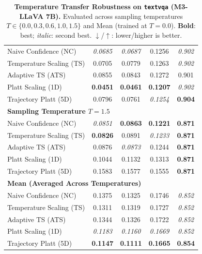 \begin{table}[t]
{\begin{tabular}{lcccc}
\midrule
Naive Confidence (NC) & \textit{0.0685} & \textit{0.0687} & 0.1256 & \textit{0.902} \\
Temperature Scaling (TS) & 0.0705 & 0.0779 & 0.1263 & \textit{0.902} \\
Adaptive TS (ATS) & 0.0855 & 0.0843 & 0.1272 & 0.901 \\
Platt Scaling (1D) & \textbf{0.0451} & \textbf{0.0461} & \textbf{0.1207} & \textit{0.902} \\
Trajectory Platt (5D) & 0.0796 & 0.0761 & \textit{0.1254} & \textbf{0.904} \\
\midrule
\multicolumn{5}{l}{\textbf{Sampling Temperature $T = 1.5$}} \\
\midrule
Naive Confidence (NC) & \textit{0.0851} & \textbf{0.0863} & \textbf{0.1221} & \textbf{0.871} \\
Temperature Scaling (TS) & \textbf{0.0826} & 0.0891 & \textit{0.1233} & \textbf{0.871} \\
Adaptive TS (ATS) & 0.0876 & \textit{0.0873} & 0.1244 & \textbf{0.871} \\
Platt Scaling (1D) & 0.1044 & 0.1132 & 0.1313 & \textbf{0.871} \\
Trajectory Platt (5D) & 0.1583 & 0.1577 & 0.1555 & \textbf{0.871} \\
\midrule
\multicolumn{5}{l}{\textbf{Mean (Averaged Across Temperatures)}} \\
\midrule
Naive Confidence (NC) & 0.1375 & 0.1325 & 0.1746 & \textit{0.852} \\
Temperature Scaling (TS) & 0.1311 & 0.1319 & 0.1727 & \textit{0.852} \\
Adaptive TS (ATS) & 0.1344 & 0.1326 & 0.1722 & \textit{0.852} \\
Platt Scaling (1D) & \textit{0.1183} & \textit{0.1160} & \textit{0.1669} & \textit{0.852} \\
Trajectory Platt (5D) & \textbf{0.1147} & \textbf{0.1111} & \textbf{0.1665} & \textbf{0.854} \\
\bottomrule
\end{tabular}%
}
\caption{\textbf{Temperature Transfer Robustness on \texttt{textvqa} (M3-LLaVA 7B).} Evaluated across sampling temperatures $T \in \{0.0, 0.3, 0.6, 1.0, 1.5\}$ and Mean (trained at $T=0.0$). \textbf{Bold}: best; \textit{italic}: second best. $\downarrow$/$\uparrow$: lower/higher is better.}
\label{tab:temp_transfer_m3_textvqa}
\end{table}

